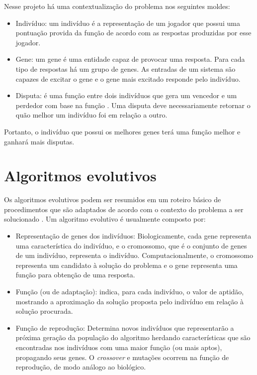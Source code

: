 Nesse projeto há uma contextualização do problema nos seguintes moldes:

\begin{itemize}
    \item Indivíduo: um indivíduo é a representação de um jogador que possui uma pontuação provida da função \fitness de acordo com as respostas produzidas por esse jogador.
    \item Gene: um gene é uma entidade capaz de provocar uma resposta. Para cada tipo de respostas há um grupo de genes. As entradas de um sistema são capazes de excitar o gene e o gene mais excitado responde pelo indivíduo.
    \item Disputa: é uma função entre dois indivíduos que gera um vencedor e um perdedor com base na função \fitness. Uma disputa deve necessariamente retornar o quão melhor um indivíduo foi em relação a outro.
\end{itemize}

Portanto, o indivíduo que possui os melhores genes terá uma função \fitness melhor e ganhará mais disputas.

\section{Algoritmos evolutivos}
Os algoritmos evolutivos podem ser resumidos em um roteiro básico de procedimentos \cite{Todd1997} que são adaptados de acordo com o contexto do problema a ser solucionado \cite{Werger1999} \cite{Mitchell1995}. Um algoritmo evolutivo é usualmente composto por:

\newcommand{\crossover}{\textit{crossover}\xspace}

\begin{itemize}
    \item Representação de genes dos indivíduos: Biologicamente, cada gene representa uma característica do indivíduo, e o cromossomo, que é o conjunto de genes de um indivíduo, representa o indivíduo. Computacionalmente, o cromossomo representa um candidato à solução do problema e o gene representa uma função para obtenção de uma resposta.
    \item Função \fitness (ou de adaptação): indica, para cada indivíduo, o valor de aptidão, mostrando a aproximação da solução proposta pelo indivíduo em relação à solução procurada.
    \item Função de reprodução: Determina novos indivíduos que representarão a próxima geração da população do algoritmo herdando características que são encontradas nos indivíduos com uma maior função \fitness (ou mais aptos), propagando seus genes. O \crossover e mutações ocorrem na função de reprodução, de modo análogo ao biológico.
\end{itemize}

